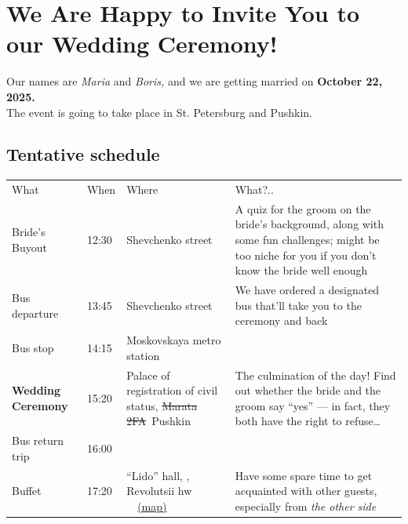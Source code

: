 \documentclass[a4paper,10pt]{article}
\begin{document}
 \phantom{Sample text}

\section*{We Are Happy to Invite You to our Wedding Ceremony!}

{\large
Our names are {\it Maria} and {\it Boris,} and we are getting
married on {\bf October 22, 2025.} \\ [0.15cm]
The event is going to take place in St. Petersburg and Pushkin.
}

\subsection*{Tentative schedule}

\begin{center} \begin{tabular}{p{2.8cm}p{1.7cm}p{4cm}p{8cm}}

\rowcolor{Orange!45!Pink!60!White}
{\sffamily\large What} & {\sffamily\large When}
  & {\sffamily\large Where} & {\sffamily\large What?..} \\

Bride's Buyout & 12:30 & Shevchenko street
  & A quiz for the groom on the bride's background,
    along with some fun challenges; might be too niche for you
    if you don't know the bride well enough \\

\rowcolor{Orange!45!Pink!60!White}
Bus departure & 13:45 & Shevchenko street
  & We have ordered a designated bus that'll take you
    to the ceremony and back \\

Bus stop & 14:15 & Moskovskaya \newline metro station \\

\rowcolor{Orange!45!Pink!60!White}
{\bf Wedding \newline Ceremony} & 15:20 & Palace of registration \newline
  of civil status, \newline \sout{Marata 2FA}~Pushkin
  & The culmination of the day! Find out whether the bride
  and the groom say ``yes'' — in fact, they both have
  the right to refuse\ldots \\

Bus return trip & 16:00 \\

\rowcolor{Orange!45!Pink!60!White}
Buffet & 17:20 & ``Lido'' hall, \newline 69, Revolutsii hw%
  \ \ \href{https://yandex.ru/maps/-/CLBhqL32}{(map)}
  & Have some spare time to get acquainted with other guests,
  especially from {\it the other side} \\


\end{tabular}
\end{center}
\end{document}
